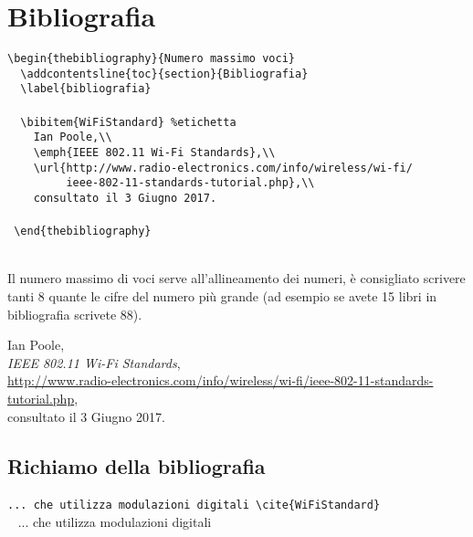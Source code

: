 \section{Bibliografia}
\verb!\begin{thebibliography}{Numero massimo voci} !\\
  \verb!  \addcontentsline{toc}{section}{Bibliografia} !\\
  \verb!  \label{bibliografia} !\\
  ~\\
  \verb!  \bibitem{WiFiStandard} %etichetta!\\
  \verb!    Ian Poole,\\ !\\
  \verb!    \emph{IEEE 802.11 Wi-Fi Standards},\\ !\\
  \verb!    \url{http://www.radio-electronics.com/info/wireless/wi-fi/!\\
  \verb!         ieee-802-11-standards-tutorial.php},\\ !\\
  \verb!    consultato il 3 Giugno 2017. !\\
  ~\\
  \verb! \end{thebibliography} !\\~\par
  Il numero massimo di voci serve all'allineamento dei numeri, è consigliato scrivere tanti 8 quante le cifre del numero più grande (ad esempio se avete 15 libri in bibliografia scrivete 88).

      \begin{thebibliography}{8}
          Ian Poole,\\
          \emph{IEEE 802.11 Wi-Fi Standards},\\
          \url{http://www.radio-electronics.com/info/wireless/wi-fi/ieee-802-11-standards-tutorial.php},\\
          consultato il 3 Giugno 2017.
      \end{thebibliography}
\subsection{Richiamo della bibliografia}
\texttt{... che utilizza modulazioni digitali \textbackslash cite\{WiFiStandard\}}~\\~
... che utilizza modulazioni digitali~\cite{WiFiStandard}\\~


